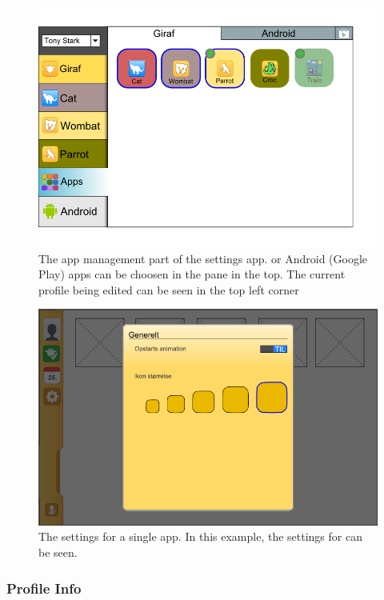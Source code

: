 \begin{figure}[p]
    \includegraphics[width=\textwidth]{figures/sprint2/apps-colorexperiment}
    \caption{The app management part of the settings app. \giraf or Android (Google Play) apps can be choosen in the pane in the top. The current profile being edited can be seen in the top left corner}
    \label{fig:profileselectionlauncherdropdown}
\end{figure}

\begin{figure}[p]
    \includegraphics[width=\textwidth]{figures/sprint2/settings-dialog}
    \caption{The settings for a single app. In this example, the settings for \launcher can be seen.}
    \label{fig:appsettingsprototype}
\end{figure}

\subsubsection{Profile Info}

